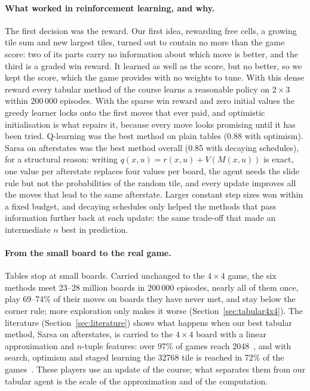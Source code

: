 \documentclass[11pt,a4paper]{article}
\theoremstyle{remark}
\begin{document}
\paragraph{What worked in reinforcement learning, and why.} The first decision was the reward. Our first idea, rewarding free cells, a growing tile sum and new largest tiles, turned out to contain no more than the game score: two of its parts carry no information about which move is better, and the third is a graded win reward. It learned as well as the score, but no better, so we kept the score, which the game provides with no weights to tune. With this dense reward every tabular method of the course learns a reasonable policy on $2\times3$ within 200\,000 episodes. With the sparse win reward and zero initial values the greedy learner locks onto the first moves that ever paid, and optimistic initialisation is what repairs it, because every move looks promising until it has been tried. Q-learning was the best method on plain tables (0.88 with optimism). Sarsa on afterstates was the best method overall (0.85 with decaying schedules), for a structural reason: writing $q(x,u)=r(x,u)+V(M(x,u))$ is exact, one value per afterstate replaces four values per board, the agent needs the slide rule but not the probabilities of the random tile, and every update improves all the moves that lead to the same afterstate. Larger constant step sizes won within a fixed budget, and decaying schedules only helped the methods that pass information further back at each update: the same trade-off that made an intermediate $n$ best in prediction.

\paragraph{From the small board to the real game.} Tables stop at small boards. Carried unchanged to the $4\times4$ game, the six methods meet 23--28 million boards in 200\,000 episodes, nearly all of them once, play 69--74\% of their moves on boards they have never met, and stay below the corner rule; more exploration only makes it worse (Section~\ref{sec:tabular4x4}). The literature (Section~\ref{sec:literature}) shows what happens when our best tabular method, Sarsa on afterstates, is carried to the $4\times4$ board with a linear approximation and $n$-tuple features: over 97\% of games reach 2048~\cite{szubert2014}, and with search, optimism and staged learning the 32768 tile is reached in 72\% of the games~\cite{guei2022}. These players use an update of the course; what separates them from our tabular agent is the scale of the approximation and of the computation.
\end{document}

